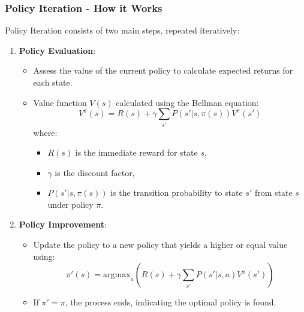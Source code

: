 \documentclass[aspectratio=169]{beamer}
\begin{document}
\begin{frame}[fragile]
    \frametitle{Policy Iteration - How it Works}
    Policy Iteration consists of two main steps, repeated iteratively:
    
    \begin{enumerate}
        \item \textbf{Policy Evaluation}:
        \begin{itemize}
            \item Assess the value of the current policy to calculate expected returns for each state.
            \item Value function \( V(s) \) calculated using the Bellman equation:
            \begin{equation}
                V^\pi(s) = R(s) + \gamma \sum_{s'} P(s' | s, \pi(s)) V^\pi(s')
            \end{equation}
            where:
            \begin{itemize}
                \item \( R(s) \) is the immediate reward for state \( s \),
                \item \( \gamma \) is the discount factor,
                \item \( P(s' | s, \pi(s)) \) is the transition probability to state \( s' \) from state \( s \) under policy \( \pi \).
            \end{itemize}
        \end{itemize}
        
        \item \textbf{Policy Improvement}:
        \begin{itemize}
            \item Update the policy to a new policy that yields a higher or equal value using:
            \begin{equation}
                \pi'(s) = \text{argmax}_a \left( R(s) + \gamma \sum_{s'} P(s' | s, a) V^\pi(s') \right)
            \end{equation}
            \item If \( \pi' = \pi \), the process ends, indicating the optimal policy is found.
        \end{itemize}
    \end{enumerate}
\end{frame}
\end{document}
